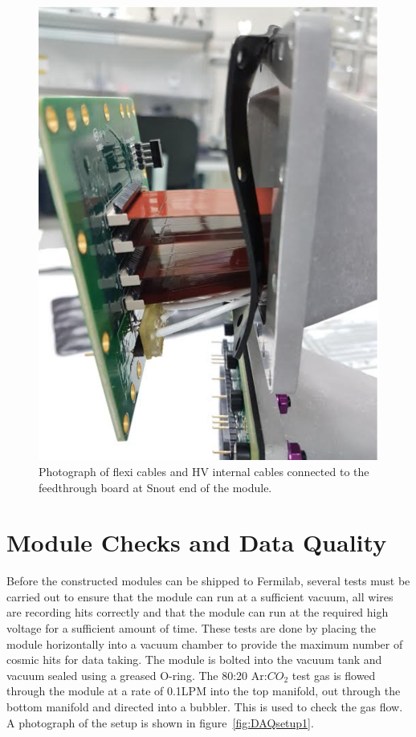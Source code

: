 \begin{figure}[ht]
\centering
\includegraphics[scale=0.4]{Figures/flexicables}
\decoRule
\caption{Photograph of flexi cables and HV internal cables connected to the feedthrough board at Snout end of the module.}
\label{fig:flexicables}
\end{figure}

\section{Module Checks and Data Quality}

Before the constructed modules can be shipped to Fermilab, several tests must be carried out to ensure that the module can run at a sufficient vacuum, all wires are recording hits correctly and that the module can run at the required high voltage for a sufficient amount of time. These tests are done by placing the module horizontally into a vacuum chamber to provide the maximum number of cosmic hits for data taking. The module is bolted into the vacuum tank and vacuum sealed using a greased O-ring. The 80:20 Ar:$CO_2$ test gas is flowed through the module at a rate of 0.1LPM into the top manifold, out through the bottom manifold and directed into a bubbler. This is used to check the gas flow. A photograph of the setup is shown in figure~\ref{fig:DAQsetup1}.

